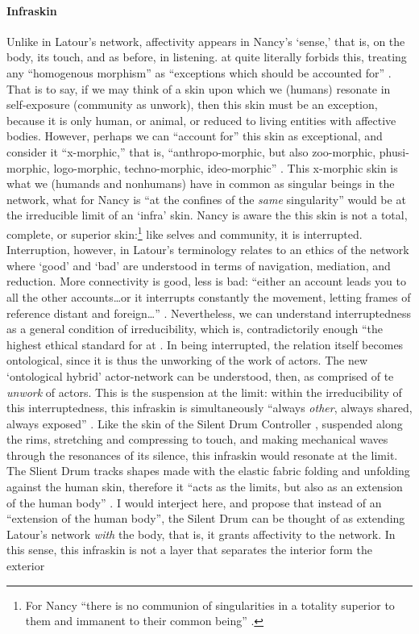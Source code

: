 \paragraph{Infraskin}
Unlike in Latour's network, affectivity appears in Nancy's `sense,' that is, on the body, its touch, and as before, in listening. \gls{at} quite literally forbids this, treating any ``homogenous morphism'' as ``exceptions which should be accounted for'' \parencite[16]{Lat90:On}. That is to say, if we may think of a skin upon which we (humans) resonate in self-exposure (community as unwork), then this skin must be an exception, because it is only human, or animal, or reduced to living entities with affective bodies. However, perhaps we can ``account for'' this skin as exceptional, and consider it ``x-morphic,'' that is, ``anthropo-morphic, but also zoo-morphic, phusi-morphic, logo-morphic, techno-morphic, ideo-morphic'' \parencite[16]{Lat90:On}. This x-morphic skin is what we (humands and nonhumans) have in common as singular beings in the network, what for Nancy is ``at the confines of the \textit{same} singularity'' \parencite[28]{Nan91:The} would be at the irreducible limit of an `infra' skin. Nancy is aware the this skin is not a total, complete, or superior skin:\footnote{For Nancy ``there is no communion of singularities in a totality superior to them and immanent to their common being'' \parencite[28]{Nan91:The}.} like selves and community, it is interrupted. Interruption, however, in Latour's terminology relates to an ethics of the network where `good' and `bad' are understood in terms of navigation, mediation, and reduction. More connectivity is good, less is bad: ``either an account leads you to all the other accounts\dots or it interrupts constantly the movement, letting frames of reference distant and foreign\dots'' \parencite[13-14]{Lat90:On}. Nevertheless, we can understand interruptedness as a general condition of irreducibility, which is, contradictorily enough ``the highest ethical standard for \gls{at} \parencite[14]{Lat90:On}. In being interrupted, the relation itself becomes ontological, since it is thus the unworking of the work of actors. The new `ontological hybrid' actor-network can be understood, then, as comprised of te \textit{unwork} of actors. This is the suspension at the limit: within the irreducibility of this interruptedness, this infraskin is simultaneously ``always \textit{other}, always shared, always exposed'' \parencite[28]{Nan91:The}. Like the skin of the Silent Drum Controller , suspended along the rims, stretching and compressing to touch, and making mechanical waves through the resonances of its silence, this infraskin would resonate at the limit. The Slient Drum tracks shapes made with the elastic fabric folding and unfolding against the human skin, therefore it ``acts as the limits, but also as an extension of the human body'' \parencite[2]{DBLP:conf/icmc/OliverJ08}. I would interject here, and propose that instead of an ``extension of the human body'', the Silent Drum can be thought of as extending Latour's network \textit{with} the body, that is, it grants affectivity to the network. In this sense, this infraskin is not a layer that separates the interior form the exterior 